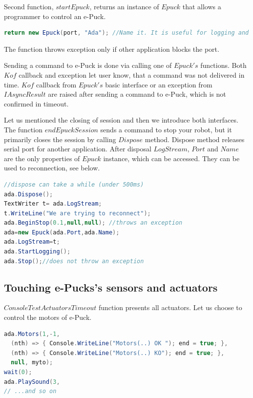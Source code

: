   Second function, $startEpuck$, returns an instance of $Epuck$ 
  that allows a programmer to control an e-Puck.
\begin{lstlisting}[language=cs]
return new Epuck(port, "Ada"); //Name it. It is useful for logging and debugging.
\end{lstlisting}
  The function throws exception only if other application blocks the port. 

  Sending a command to e-Puck is done via calling one of $Epuck's$ functions.
  Both $Kof$ callback and exception let user know, that a command was not delivered in time.
  $Kof$ callback from $Epuck's$ basic interface or an exception	
  from $IAsyncResult$ are raised after sending a command to e-Puck, 
  which is not confirmed in timeout.

  Let us mentioned the closing of session and then we introduce both interfaces.
  The function $endEpuckSession$ sends a command to stop your robot, 
  but it primarily closes the session by calling $Dispose$ method.
  Dispose method releases serial port for another application. 
  After disposal $LogStream$, $Port$ and $Name$ are the 
  only properties of $Epuck$ instance, which can be accessed. 
  They can be used to reconnection, see below.

\begin{lstlisting}[language=cs]
//dispose can take a while (under 500ms)
ada.Dispose();
TextWriter t= ada.LogStream;
t.WriteLine("We are trying to reconnect");
ada.BeginStop(0.1,null,null); //throws an exception
ada=new Epuck(ada.Port,ada.Name);
ada.LogStream=t;
ada.StartLogging();
ada.Stop();//does not throw an exception
\end{lstlisting}

\subsection{Touching e-Pucks's sensors and actuators}\label{sec:touching}
  $ConsoleTestActuatorsTimeout$ function presents all actuators. Let us choose to control the motors of e-Puck.
\begin{lstlisting}[language=cs]
ada.Motors(1,-1,
  (nth) => { Console.WriteLine("Motors(..) OK "); end = true; },
  (nth) => { Console.WriteLine("Motors(..) KO"); end = true; },
  null, myto);
wait(0);
ada.PlaySound(3,
// ...and so on
\end{lstlisting}
  
